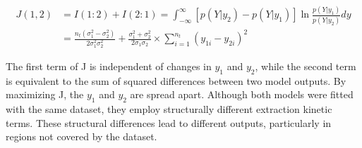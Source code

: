 \documentclass[../Article_Design_of_Experiment.tex]{subfiles}
\begin{document}
	{\footnotesize
	\begin{align}
		J(1,2) &= I(1:2) + I(2:1) = \int_{-\infty}^{\infty} [p(Y|y_2) - p(Y|y_1)] \ln \frac{p(Y|y_1)}{p(Y|y_2)} dy \nonumber \\
		&= \frac{n_t(\sigma_1^2-\sigma_2^2)}{2\sigma_1^2\sigma_2^2} + \frac{\sigma_1^2+\sigma_2^2}{2\sigma_1\sigma_2}\times \sum_{i=1}^{n_t} \left( y_{1i}-y_{2i} \right)^2
	\end{align} }
	
	The first term of J is independent of changes in $y_{1}$ and $y_{2}$, while the second term is equivalent to the sum of squared differences between two model outputs. By maximizing J, the $y_1$ and $y_2$ are spread apart. Although both models were fitted with the same dataset, they employ structurally different extraction kinetic terms. These structural differences lead to different outputs, particularly in regions not covered by the dataset.
\end{document}
